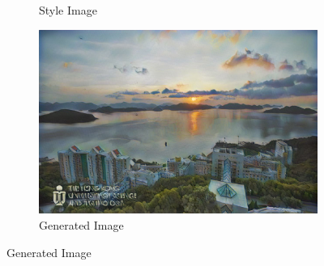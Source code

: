 \documentclass{article}
\begin{document}
\begin{figure}[h!]
\begin{minipage}{\textwidth}
\begin{subfigure}{0.25\textwidth}
            \caption{Style Image}
        \end{subfigure}
        \hfill %
        \begin{subfigure}{0.25\textwidth}
            \includegraphics[width=\textwidth]{./part1_inference/output_2_camille-corot_toulon-battleships-dismantled.jpg}
            \caption{Generated Image}
        \end{subfigure}
    \end{minipage}
    
    \vspace{0.1cm}


\end{figure}
\end{document}
